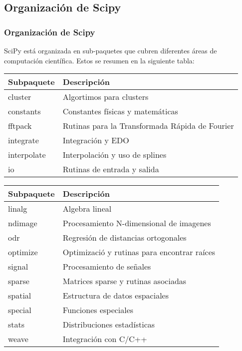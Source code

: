 \subsection{Organizaci\'{o}n de Scipy}
\begin{frame}
\frametitle{Organizaci\'{o}n de Scipy}
SciPy est\'{a} organizada en sub-paquetes que cubren diferentes \'{a}reas de computaci\'{o}n cient\'{i}fica. Estos se resumen en la siguiente tabla:
\fontsize{12}{12}\selectfont
\begin{tabular}{l | l}
	Subpaquete	&	Descripci\'{o}n \\ \hline
	cluster		&	Algortimos para clusters \\ \hline
	constants	&	Constantes f\'{i}sicas y matem\'{a}ticas \\ \hline
	fftpack 	&	Rutinas para la Transformada R\'{a}pida de Fourier \\ \hline
	integrate	&	Integraci\'{o}n y EDO \\ \hline
	interpolate	&	Interpolaci\'{o}n y uso de splines \\ \hline
	io			&	Rutinas de entrada y salida
\end{tabular}
\end{frame}
\begin{frame}
\fontsize{12}{12}\selectfont
\begin{tabular}{l | l}
	Subpaquete	&	Descripci\'{o}n \\ \hline
	linalg		&	Algebra lineal \\ \hline
	ndimage		&	Procesamiento N-dimensional de imagenes \\ \hline
	odr			&	Regresi\'{o}n de distancias ortogonales \\ \hline
	optimize	&	Optimizaci\'{o} y rutinas para encontrar ra\'{i}ces \\ \hline
	signal		&	Procesamiento de señales \\ \hline
	sparse		&	Matrices sparse y rutinas asociadas \\ \hline
	spatial		&	Estructura de datos espaciales \\ \hline
	special		&	Funciones especiales \\ \hline
	stats		&	Distribuciones estad\'{i}sticas \\ \hline
	weave		&	Integraci\'{o}n con C/C++
\end{tabular}
\end{frame}
